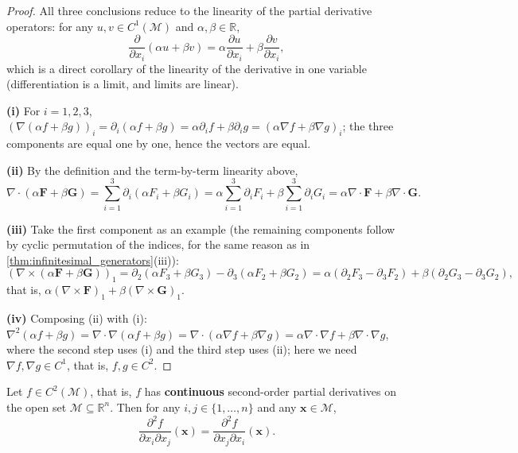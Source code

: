 \begin{proof}
All three conclusions reduce to the linearity of the partial derivative operators: for any $u,v\in C^1(\mathcal M)$ and $\alpha,\beta\in\mathbb R$,
\[
\frac{\partial}{\partial x_i}(\alpha u+\beta v) = \alpha\frac{\partial u}{\partial x_i}+\beta\frac{\partial v}{\partial x_i},
\]
which is a direct corollary of the linearity of the derivative in one variable (differentiation is a limit, and limits are linear).

\textbf{(i)} For $i=1,2,3$, $(\nabla(\alpha f+\beta g))_i = \partial_i(\alpha f+\beta g) = \alpha\partial_i f+\beta\partial_i g = (\alpha\nabla f+\beta\nabla g)_i$; the three components are equal one by one, hence the vectors are equal.

\textbf{(ii)} By the definition and the term-by-term linearity above,
\[
\nabla\cdot(\alpha\mathbf F+\beta\mathbf G) = \sum_{i=1}^3\partial_i(\alpha F_i+\beta G_i) = \alpha\sum_{i=1}^3\partial_iF_i+\beta\sum_{i=1}^3\partial_iG_i = \alpha\nabla\cdot\mathbf F+\beta\nabla\cdot\mathbf G .
\]

\textbf{(iii)} Take the first component as an example (the remaining components follow by cyclic permutation of the indices, for the same reason as in \cref{thm:infinitesimal_generators}(iii)):
\[
(\nabla\times(\alpha\mathbf F+\beta\mathbf G))_1 = \partial_2(\alpha F_3+\beta G_3)-\partial_3(\alpha F_2+\beta G_2)
= \alpha(\partial_2F_3-\partial_3F_2)+\beta(\partial_2G_3-\partial_3G_2),
\]
that is, $\alpha(\nabla\times\mathbf F)_1+\beta(\nabla\times\mathbf G)_1$.

\textbf{(iv)} Composing (ii) with (i): $\nabla^2(\alpha f+\beta g) = \nabla\cdot\nabla(\alpha f+\beta g) = \nabla\cdot(\alpha\nabla f+\beta\nabla g) = \alpha\nabla\cdot\nabla f+\beta\nabla\cdot\nabla g$, where the second step uses (i) and the third step uses (ii); here we need $\nabla f,\nabla g\in C^1$, that is, $f,g\in C^2$.
\end{proof}

\begin{lemma}\label{lem:clairaut}
Let $f \in C^2(\mathcal{M})$, that is, $f$ has \textbf{continuous} second-order partial derivatives on the open set $\mathcal M\subseteq\mathbb R^n$. Then for any $i,j \in \{1,\dots,n\}$ and any $\mathbf x\in\mathcal M$,
\[
\frac{\partial^2 f}{\partial x_i \partial x_j}(\mathbf x)
=
\frac{\partial^2 f}{\partial x_j \partial x_i}(\mathbf x).
\]
\end{lemma}

